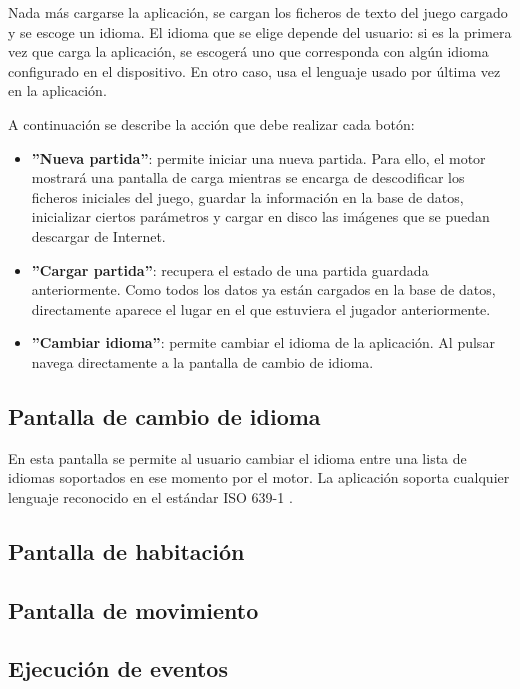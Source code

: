 Nada más cargarse la aplicación, se cargan los ficheros de texto del juego cargado y se escoge un idioma.
El idioma que se elige depende del usuario: si es la primera vez que carga la aplicación, se escogerá uno que corresponda con algún idioma configurado en el dispositivo. En otro caso, usa el lenguaje usado por última vez en la aplicación.

A continuación se describe la acción que debe realizar cada botón:

\begin{itemize}
	\item \textbf{''Nueva partida''}: permite iniciar una nueva partida. Para ello, el motor mostrará una pantalla de carga mientras se encarga de descodificar los ficheros iniciales del juego, guardar la información en la base de datos, inicializar ciertos parámetros y cargar en disco las imágenes que se puedan descargar de Internet.
	\item \textbf{''Cargar partida''}: recupera el estado de una partida guardada anteriormente. Como todos los datos ya están cargados en la base de datos, directamente aparece el lugar en el que estuviera el jugador anteriormente.
	\item \textbf{''Cambiar idioma''}: permite cambiar el idioma de la aplicación. Al pulsar navega directamente a la pantalla de cambio de idioma.
\end{itemize}

\subsection{Pantalla de cambio de idioma}
En esta pantalla se permite al usuario cambiar el idioma entre una lista de idiomas soportados en ese momento por el motor. La aplicación soporta cualquier lenguaje reconocido en el estándar ISO 639-1 \cite{iso639-1Codes}.


\subsection{Pantalla de habitación}

\subsection{Pantalla de movimiento}

\subsection{Ejecución de eventos}

